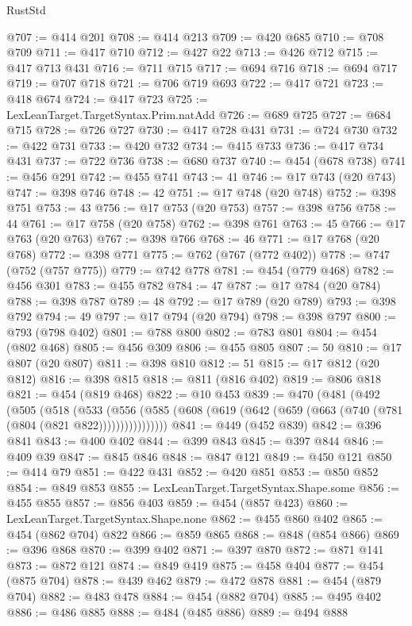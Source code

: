 \begin{lexlean}{RustStd}
\begin{coremodule}
@707 := @414 @201
@708 := @414 @213
@709 := @420 @685
@710 := @708 @709
@711 := @417 @710
@712 := @427 @22
@713 := @426 @712
@715 := @417 @713 @431
@716 := @711 @715
@717 := @694 @716
@718 := @694 @717
@719 := @707 @718
@721 := @706 @719 @693
@722 := @417 @721
@723 := @418 @674
@724 := @417 @723
@725 := LexLeanTarget.TargetSyntax.Prim.natAdd
@726 := @689 @725
@727 := @684 @715
@728 := @726 @727
@730 := @417 @728 @431
@731 := @724 @730
@732 := @422 @731
@733 := @420 @732
@734 := @415 @733
@736 := @417 @734 @431
@737 := @722 @736
@738 := @680 @737
@740 := @454 (@678 @738)
@741 := @456 @291
@742 := @455 @741
@743 := 41
@746 := @17 @743 (@20 @743)
@747 := @398 @746
@748 := 42
@751 := @17 @748 (@20 @748)
@752 := @398 @751
@753 := 43
@756 := @17 @753 (@20 @753)
@757 := @398 @756
@758 := 44
@761 := @17 @758 (@20 @758)
@762 := @398 @761
@763 := 45
@766 := @17 @763 (@20 @763)
@767 := @398 @766
@768 := 46
@771 := @17 @768 (@20 @768)
@772 := @398 @771
@775 := @762 (@767 (@772 @402))
@778 := @747 (@752 (@757 @775))
@779 := @742 @778
@781 := @454 (@779 @468)
@782 := @456 @301
@783 := @455 @782
@784 := 47
@787 := @17 @784 (@20 @784)
@788 := @398 @787
@789 := 48
@792 := @17 @789 (@20 @789)
@793 := @398 @792
@794 := 49
@797 := @17 @794 (@20 @794)
@798 := @398 @797
@800 := @793 (@798 @402)
@801 := @788 @800
@802 := @783 @801
@804 := @454 (@802 @468)
@805 := @456 @309
@806 := @455 @805
@807 := 50
@810 := @17 @807 (@20 @807)
@811 := @398 @810
@812 := 51
@815 := @17 @812 (@20 @812)
@816 := @398 @815
@818 := @811 (@816 @402)
@819 := @806 @818
@821 := @454 (@819 @468)
@822 := @10 @453
@839 := @470
    (@481
      (@492
        (@505
          (@518
            (@533
              (@556 (@585 (@608 (@619 (@642 (@659 (@663 (@740 (@781 (@804 (@821 @822))))))))))))))))
@841 := @449 (@452 @839)
@842 := @396 @841
@843 := @400 @402
@844 := @399 @843
@845 := @397 @844
@846 := @409 @39
@847 := @845 @846
@848 := @847 @121
@849 := @450 @121
@850 := @414 @79
@851 := @422 @431
@852 := @420 @851
@853 := @850 @852
@854 := @849 @853
@855 := LexLeanTarget.TargetSyntax.Shape.some
@856 := @455 @855
@857 := @856 @403
@859 := @454 (@857 @423)
@860 := LexLeanTarget.TargetSyntax.Shape.none
@862 := @455 @860 @402
@865 := @454 (@862 @704) @822
@866 := @859 @865
@868 := @848 (@854 @866)
@869 := @396 @868
@870 := @399 @402
@871 := @397 @870
@872 := @871 @141
@873 := @872 @121
@874 := @849 @419
@875 := @458 @404
@877 := @454 (@875 @704)
@878 := @439 @462
@879 := @472 @878
@881 := @454 (@879 @704)
@882 := @483 @478
@884 := @454 (@882 @704)
@885 := @495 @402
@886 := @486 @885
@888 := @484 (@485 @886)
@889 := @494 @888

\end{coremodule}
\end{lexlean}
